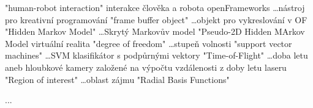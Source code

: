 
\abbrv[HRI]	"human-robot interaction" \dot interakce člověka a robota
\abbrv[OF]	openFrameworks \dots nástroj pro kreativní programování
\abbrv[FBO]  "frame buffer object" \dots objekt pro vykreslování v OF
\abbrv[HMM]  "Hidden Markov Model" \dots Skrytý Markovův model
\abbrv[P2DHMM]  "Pseudo-2D Hidden MArkov Model
\abbrv[VR]  virtuální realita
\abbrv[DOF]  "degree of freedom" \dots stupeň volnosti
\abbrv[SVM]  "support vector machines" \dots SVM klasifikátor s podpůrnými vektory
\abbrv[ToF]  "Time-of-Flight" \dots doba letu aneb hloubkové kamery založené na výpočtu vzdálenosti z doby letu laseru
\abbrv[ROI]  "Region of interest" \dots oblast zájmu
\abbrv[RBF]  "Radial Basis Functions"

\abbrv[...]     ...
\stopAbbreviations

\endinput
